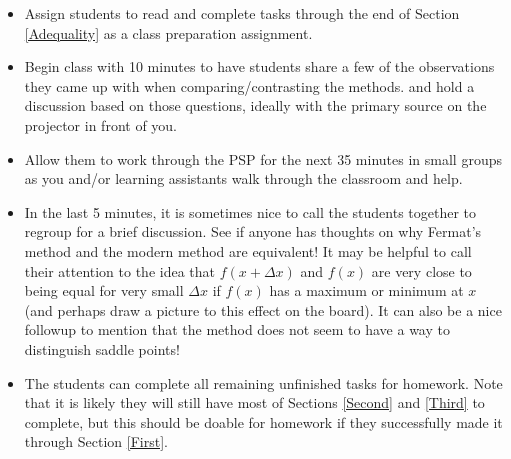 \begin{itemize}
\item Assign students to read and complete tasks through the end of
  Section \ref{Adequality} as a class preparation assignment.
\item Begin class with 10 minutes to have students share a few of the
  observations they came up with when comparing/contrasting the
  methods. and hold a discussion based on those questions, ideally
  with the primary source on the projector in front of you.
\item Allow them to work through the PSP for the next 35 minutes in
  small groups as you and/or learning assistants walk through the
  classroom and help.
\item In the last 5 minutes, it is sometimes nice to call the students
  together to regroup for a brief discussion.  See if anyone has
  thoughts on why Fermat's method and the modern method are
  equivalent!  It may be helpful to call their attention to the idea
  that $f(x+\Delta x)$ and $f(x)$ are very close to being equal for
  very small $\Delta x$ if $f(x)$ has a maximum or minimum at $x$ (and
  perhaps draw a picture to this effect on the board).  It can also be
  a nice followup to mention that the method does not seem to have a
  way to distinguish saddle points!
\item The students can complete all remaining unfinished tasks for
  homework.  Note that it is likely they will still have most of
  Sections \ref{Second} and \ref{Third} to complete, but this should
  be doable for homework if they successfully made it through Section
  \ref{First}.
\end{itemize}

 

